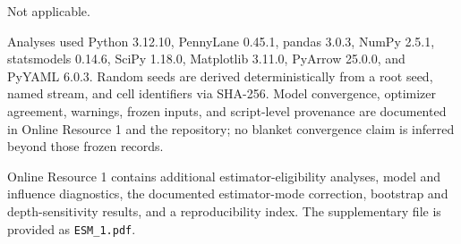 \documentclass[pdflatex,sn-mathphys-num,Numbered]{sn-jnl}
\begin{document}
 Not applicable.

 Analyses used Python 3.12.10, PennyLane 0.45.1, pandas 3.0.3, NumPy 2.5.1, statsmodels 0.14.6, SciPy 1.18.0, Matplotlib 3.11.0, PyArrow 25.0.0, and PyYAML 6.0.3. Random seeds are derived deterministically from a root seed, named stream, and cell identifiers via SHA-256. Model convergence, optimizer agreement, warnings, frozen inputs, and script-level provenance are documented in Online Resource 1 and the repository; no blanket convergence claim is inferred beyond those frozen records.

 Online Resource 1 contains additional estimator-eligibility analyses, model and influence diagnostics, the documented estimator-mode correction, bootstrap and depth-sensitivity results, and a reproducibility index. The supplementary file is provided as \texttt{ESM\_1.pdf}.


\end{document}
